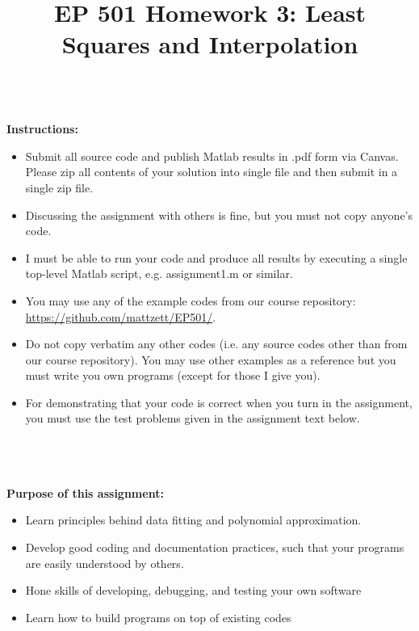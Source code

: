 \documentclass{article}
\begin{document}
\title{EP 501 Homework 3:  Least Squares and Interpolation}

\maketitle

~\\
\textbf{Instructions:}  
\begin{itemize}
  \item Submit all source code and publish Matlab results in .pdf form via Canvas.  Please zip all contents of your solution into single file and then submit in a single zip file.    
  \item Discussing the assignment with others is fine, but you must not copy anyone's code.  
  \item I must be able to run your code and produce all results by executing a single top-level Matlab script, e.g. \textsf{assignment1.m} or similar.  
  \item You may use any of the example codes from our course repository:  \url{https://github.com/mattzett/EP501/}.
  \item Do not copy verbatim any other codes (i.e. any source codes other than from our course repository).  You may use other examples as a reference but you must write you own programs (except for those I give you).  
    \item For demonstrating that your code is correct when you turn in the assignment, you must use the test problems given in the assignment text below.  

\end{itemize}
~\\~\\~\\
\textbf{Purpose of this assignment:}  
\begin{itemize}
  \item Learn principles behind data fitting and polynomial approximation.  
  \item Develop good coding and documentation practices, such that your programs are easily understood by others.  
  \item Hone skills of developing, debugging, and testing your own software
  \item Learn how to build programs on top of existing codes
\end{itemize}

\pagebreak
\end{document}
